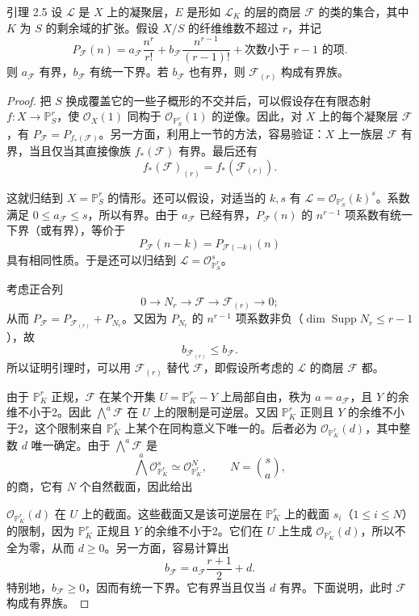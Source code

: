 \begin{statement}{引理 2.5}
设 $\mathcal L$ 是 $X$ 上的凝聚层，$E$ 是形如 $\mathcal L_K$ 的层的商层 $\mathcal F$ 的类的集合，其中 $K$ 为 $S$ 的剩余域的扩张。假设 $X/S$ 的纤维维数不超过 $r$，并记
\[
P_{\mathcal F}(n)=a_{\mathcal F}\frac{n^r}{r!}
+b_{\mathcal F}\frac{n^{r-1}}{(r-1)!}
+\text{次数小于 }r-1\text{ 的项}.
\]
则 $a_{\mathcal F}$ 有界，$b_{\mathcal F}$ 有统一下界。若 $b_{\mathcal F}$ 也有界，则 $\mathcal F_{(r)}$ 构成有界族。
\end{statement}
\begin{proof}
把 $S$ 换成覆盖它的一些子概形的不交并后，可以假设存在有限态射 $f:X\to\mathbb P^r_S$，使 $\mathcal O_X(1)$ 同构于 $\mathcal O_{\mathbb P^r_S}(1)$ 的逆像。因此，对 $X$ 上的每个凝聚层 $\mathcal F$，有 $P_{\mathcal F}=P_{f_*(\mathcal F)}$。另一方面，利用上一节的方法，容易验证：$X$ 上一族层 $\mathcal F$ 有界，当且仅当其直接像族 $f_*(\mathcal F)$ 有界。最后还有
\[
f_*(\mathcal F)_{(r)}=f_*(\mathcal F_{(r)}).
\]

这就归结到 $X=\mathbb P^r_S$ 的情形。还可以假设，对适当的 $k,s$ 有 $\mathcal L=\mathcal O_{\mathbb P^r_S}(k)^s$。系数满足 $0\leq a_{\mathcal F}\leq s$，所以有界。由于 $a_{\mathcal F}$ 已经有界，$P_{\mathcal F}(n)$ 的 $n^{r-1}$ 项系数有统一下界（或有界），等价于
\[
P_{\mathcal F}(n-k)=P_{\mathcal F(-k)}(n)
\]
具有相同性质。于是还可以归结到 $\mathcal L=\mathcal O_{\mathbb P^r_S}^{s}$。

考虑正合列
\[
0\longrightarrow N_r\longrightarrow\mathcal F
\longrightarrow\mathcal F_{(r)}\longrightarrow0;
\]
从而 $P_{\mathcal F}=P_{\mathcal F_{(r)}}+P_{N_r}$。又因为 $P_{N_r}$ 的 $n^{r-1}$ 项系数非负（$\dim\operatorname{Supp}N_r\leq r-1$），故
\[
b_{\mathcal F_{(r)}}\leq b_{\mathcal F}.
\]
所以证明引理时，可以用 $\mathcal F_{(r)}$ 替代 $\mathcal F$，即假设所考虑的 $\mathcal L$ 的商层 $\mathcal F$ 都。

由于 $\mathbb P^r_K$ 正规，$\mathcal F$ 在某个开集 $U=\mathbb P^r_K-Y$ 上局部自由，秩为 $a=a_{\mathcal F}$，且 $Y$ 的余维不小于2。因此 $\bigwedge^a\mathcal F$ 在 $U$ 上的限制是可逆层。又因 $\mathbb P^r_K$ 正则且 $Y$ 的余维不小于2，这个限制来自 $\mathbb P^r_K$ 上某个在同构意义下唯一的。后者必为 $\mathcal O_{\mathbb P^r_K}(d)$，其中整数 $d$ 唯一确定。由于 $\bigwedge^a\mathcal F$ 是
\[
\bigwedge^a\mathcal O_{\mathbb P^r_K}^{s}\simeq
\mathcal O_{\mathbb P^r_K}^{N},\qquad N=\binom{s}{a},
\]
的商，它有 $N$ 个自然截面，因此给出

$\mathcal O_{\mathbb P^r_K}(d)$ 在 $U$ 上的截面。这些截面又是该可逆层在 $\mathbb P^r_K$ 上的截面 $s_i$（$1\leq i\leq N$）的限制，因为 $\mathbb P^r_K$ 正规且 $Y$ 的余维不小于2。它们在 $U$ 上生成 $\mathcal O_{\mathbb P^r_K}(d)$，所以不全为零，从而 $d\geq0$。另一方面，容易计算出
\[
b_{\mathcal F}=a_{\mathcal F}\frac{r+1}{2}+d.
\]
特别地，$b_{\mathcal F}\geq0$，因而有统一下界。它有界当且仅当 $d$ 有界。下面说明，此时 $\mathcal F$ 构成有界族。


\end{proof}
